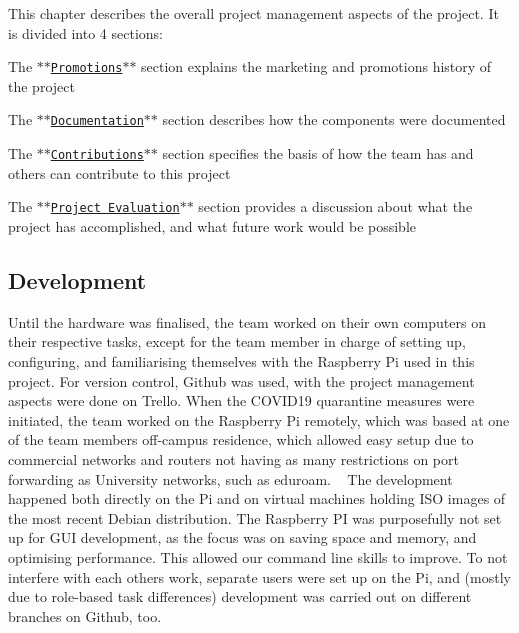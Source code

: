 This chapter describes the overall project management aspects of the project. It is divided into 4 sections\+:
\begin{DoxyItemize}
\item The $\ast$$\ast$\href{https://github.com/itsBelinda/ENG5220-2020-Team13/wiki/Promotions}{\tt Promotions}$\ast$$\ast$ section explains the marketing and promotions history of the project
\item The $\ast$$\ast$\href{https://github.com/itsBelinda/ENG5220-2020-Team13/wiki/Documentation }{\tt Documentation}$\ast$$\ast$ section describes how the components were documented
\item The $\ast$$\ast$\href{https://github.com/itsBelinda/ENG5220-2020-Team13/wiki/Contributions}{\tt Contributions}$\ast$$\ast$ section specifies the basis of how the team has and others can contribute to this project
\item The $\ast$$\ast$\href{https://github.com/itsBelinda/ENG5220-2020-Team13/wiki/Project-Evaluation}{\tt Project Evaluation}$\ast$$\ast$ section provides a discussion about what the project has accomplished, and what future work would be possible
\end{DoxyItemize}

\subsection*{Development}

Until the hardware was finalised, the team worked on their own computers on their respective tasks, except for the team member in charge of setting up, configuring, and familiarising themselves with the Raspberry Pi used in this project. For version control, Github was used, with the project management aspects were done on Trello. When the C\+O\+V\+I\+D19 quarantine measures were initiated, the team worked on the Raspberry Pi remotely, which was based at one of the team members\textquotesingle{} off-\/campus residence, which allowed easy setup due to commercial networks and routers not having as many restrictions on port forwarding as University networks, such as {\ttfamily eduroam}. ~\newline
 The development happened both directly on the Pi and on virtual machines holding I\+SO images of the most recent Debian distribution. The Raspberry PI was purposefully not set up for G\+UI development, as the focus was on saving space and memory, and optimising performance. This allowed our command line skills to improve. To not interfere with each others\textquotesingle{} work, separate users were set up on the Pi, and (mostly due to role-\/based task differences) development was carried out on different branches on Github, too.

